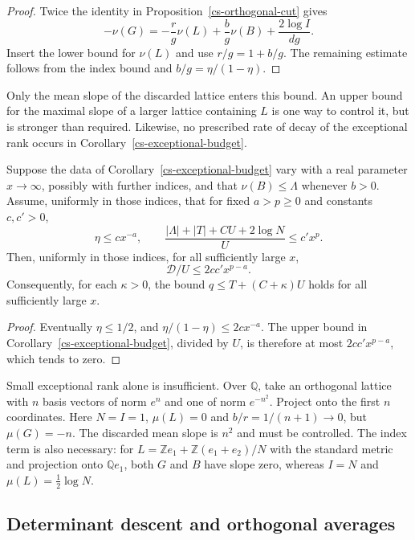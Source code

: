 \begin{proof}
Twice the identity in Proposition~\ref{cs-orthogonal-cut} gives
\[
 -\nu(G)=-\frac rg\nu(L)+\frac bg\nu(B)+\frac{2\log I}{dg}.
\]
Insert the lower bound for $\nu(L)$ and use $r/g=1+b/g$.
The remaining estimate follows from the index bound and
$b/g=\eta/(1-\eta)$.
\end{proof}

Only the mean slope of the discarded lattice enters this bound.
An upper bound for the maximal slope of a larger lattice containing
$L$ is one way to control it, but is stronger than required.
Likewise, no prescribed rate of decay of the exceptional rank occurs
in Corollary~\ref{cs-exceptional-budget}.

\begin{corollary}\label{cs-polynomial-exceptional}
Suppose the data of Corollary~\ref{cs-exceptional-budget} vary with a
real parameter $x\to\infty$, possibly with further indices, and that
$\nu(B)\le\Lambda$ whenever $b>0$. Assume, uniformly in those indices,
that for fixed $a>p\ge0$ and constants $c,c'>0$,
\[
 \eta\le c x^{-a},\qquad
 \frac{|\Lambda|+|T|+CU+2\log N}{U}\le c'x^p.
\]
Then, uniformly in those indices, for all sufficiently large $x$,
\[
 \mathcal D/U\le 2cc'x^{p-a}.
\]
Consequently, for each $\kappa>0$, the bound
$q\le T+(C+\kappa)U$ holds for all sufficiently large $x$.
\end{corollary}

\begin{proof}
Eventually $\eta\le1/2$, and
$\eta/(1-\eta)\le2c x^{-a}$. The upper bound in
Corollary~\ref{cs-exceptional-budget}, divided by $U$, is therefore
at most $2cc'x^{p-a}$, which tends to zero.
\end{proof}

Small exceptional rank alone is insufficient. Over $\mathbb Q$, take
an orthogonal lattice with $n$ basis vectors of norm $e^n$ and one
of norm $e^{-n^2}$. Project onto the first $n$ coordinates. Here
$N=I=1$, $\mu(L)=0$ and $b/r=1/(n+1)\to0$, but
$\mu(G)=-n$. The discarded mean slope is $n^2$ and must be controlled.
The index term is also necessary: for
$L=\mathbb Ze_1+\mathbb Z(e_1+e_2)/N$ with the standard metric and
projection onto $\mathbb Qe_1$, both $G$ and $B$ have slope zero,
whereas $I=N$ and $\mu(L)=\tfrac12\log N$.

\subsection{Determinant descent and orthogonal averages}


